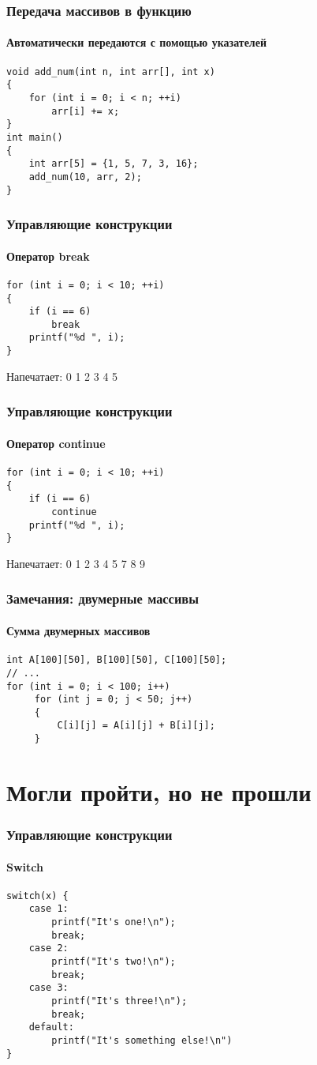 \documentclass[12pt,pdf,hyperref={unicode}]{beamer}
\begin{document}
\begin{frame}[fragile]
\frametitle{Передача массивов в функцию}
\framesubtitle{Автоматически передаются с помощью указателей}
\begin{lstlisting}
void add_num(int n, int arr[], int x)
{
    for (int i = 0; i < n; ++i)
        arr[i] += x;
}
int main()
{
    int arr[5] = {1, 5, 7, 3, 16};
    add_num(10, arr, 2);
}
\end{lstlisting}
\end{frame}

\begin{frame}[fragile]
\frametitle{Управляющие конструкции} 
\framesubtitle{Оператор break}
\begin{lstlisting}
for (int i = 0; i < 10; ++i)
{
    if (i == 6)
        break
    printf("%d ", i);
}
\end{lstlisting}
Напечатает: 0 1 2 3 4 5
\end{frame}

\begin{frame}[fragile]
\frametitle{Управляющие конструкции} 
\framesubtitle{Оператор continue}
\begin{lstlisting}
for (int i = 0; i < 10; ++i)
{
    if (i == 6)
        continue
    printf("%d ", i);
}
\end{lstlisting}
Напечатает: 0 1 2 3 4 5 7 8 9
\end{frame}

\begin{frame}[fragile]
\frametitle{Замечания: двумерные массивы}
\framesubtitle{Сумма двумерных массивов}
\begin{lstlisting}
int A[100][50], B[100][50], C[100][50];
// ... 
for (int i = 0; i < 100; i++)
     for (int j = 0; j < 50; j++)
     {
         C[i][j] = A[i][j] + B[i][j];
     }
\end{lstlisting}
\end{frame}



\section{Могли пройти, но не прошли}


\begin{frame}[fragile]
\frametitle{Управляющие конструкции} 
\framesubtitle{Switch}
\begin{lstlisting}
switch(x) {
    case 1:
        printf("It's one!\n");
        break;
    case 2:
        printf("It's two!\n");
        break;
    case 3:
        printf("It's three!\n");
        break;
    default:
        printf("It's something else!\n")
}
\end{lstlisting}
\end{frame}
\end{document}
